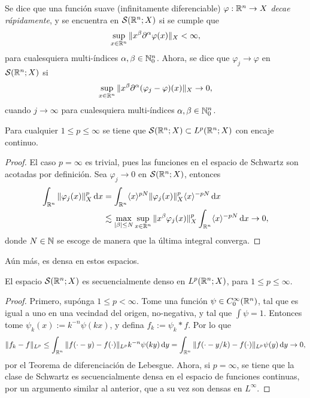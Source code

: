 \begin{definition}
    Se dice que una función suave (infinitamente diferenciable) 
    $\varphi:\mathbb{R}^n\rightarrow X$ \textit{decae rápidamente}, y se encuentra en $\mathcal{S}(\mathbb{R}^n;X)$ si se 
    cumple que
    \begin{equation*}
        \sup_{x\in\mathbb{R}^n}\|x^\beta \partial^\alpha \varphi(x)\|_X < \infty, 
    \end{equation*}
    para cualesquiera multi-índices $\alpha, \beta \in \mathbb{N}_0^n$. Ahora,
    se dice que $\varphi_j\rightarrow\varphi$ en $\mathcal{S}(\mathbb{R}^n;X)$ si
    \begin{equation*}
        \sup_{x\in\mathbb{R}^n}\|x^\beta \partial^\alpha (\varphi_j-
        \varphi)(x)\|_X \rightarrow 0, 
    \end{equation*}
    cuando $j\rightarrow\infty$ para cualesquiera multi-índices 
    $\alpha, \beta \in \mathbb{N}_0^n$.
\end{definition}
\begin{proposition}
    Para cualquier $1\leq p\leq\infty$ se tiene que 
    $\mathcal{S}(\mathbb{R}^n;X)\subset L^p(\mathbb{R}^n;X)$ con encaje continuo.
\end{proposition}
\begin{proof}
    El caso $p=\infty$ es trivial, pues las funciones en el espacio de Schwartz
    son acotadas por definición.
    Sea $\varphi_j\rightarrow0$ en $\mathcal{S}(\mathbb{R}^n;X)$, entonces
    \begin{align*}
        \int_{\mathbb{R}^n} \|\varphi_j(x)\|_X^p \mathop{}\!\mathrm{d} x & = 
        \int_{\mathbb{R}^n} \langle x\rangle^{pN} \|\varphi_j(x)\|_X^p \langle x\rangle^{-pN} \mathop{}\!\mathrm{d} x \\ 
        & \lesssim \max_{|\beta|\leq N} \sup_{x\in\mathbb{R}^n} 
        \|x^\beta\varphi_j(x)\|_X^p \int_{\mathbb{R}^n}\langle x\rangle^{-pN} \mathop{}\!\mathrm{d} x \to 0  ,
    \end{align*}
    donde $N\in\mathbb{N}$ se escoge de manera que la última integral converga. 
\end{proof}
Aún más, es densa en estos espacios.
\begin{theorem}
	El espacio $\mathcal{S}(\mathbb{R}^n;X)$ es secuencialmente denso en $L^p(\mathbb{R}^n;X)$, para $1\leq p\leq\infty$.
\end{theorem}
\begin{proof}
	Primero, supónga $1\leq p<\infty$. Tome una función $\psi\in C^\infty_0(\mathbb{R}^n)$, tal que es igual a uno en una vecindad del origen, no-negativa, y tal que $\int\psi = 1$. Entonces tome $\psi_k(x) := k^{-n}\psi(kx)$, y defina $f_k := \psi_k * f$. Por lo que 
	\begin{equation*}
		\|f_k - f\|_{L^p} \leq \int_{\mathbb{R}^n} \|f(\cdot - y) - f(\cdot)\|_{L^p}k^{-n}\psi(ky) \mathop{}\!\mathrm{d} y =  \int_{\mathbb{R}^n} \|f(\cdot - y/k) - f(\cdot)\|_{L^p}\psi(y)\mathop{}\!\mathrm{d} y \to 0,
	\end{equation*}
	por el Teorema de diferenciación de Lebesgue. Ahora, si $p=\infty$, se tiene que la clase de Schwartz es secuencialmente densa en el espacio de funciones continuas, por un argumento similar al anterior, que a su vez son densas en $L^\infty$.
\end{proof}
